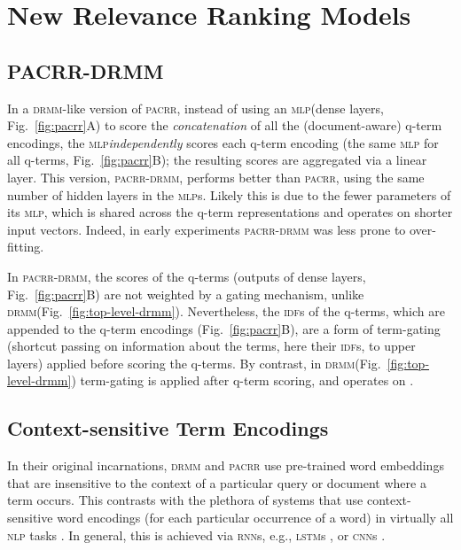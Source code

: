 \documentclass[11pt,a4paper]{article}
\newcommand{\mlp}{\textsc{mlp}\xspace}
\newcommand{\lstm}{\textsc{lstm}\xspace}
\newcommand{\rnn}{\textsc{rnn}\xspace}
\newcommand{\cnn}{\textsc{cnn}\xspace}
\newcommand{\nlp}{\textsc{nlp}\xspace}
\newcommand{\drmm}{\textsc{drmm}\xspace}
\newcommand{\pacrr}{\textsc{pacrr}\xspace}
\newcommand{\pacrrdrmm}{\textsc{pacrr-drmm}\xspace}
\newcommand{\idf}{\textsc{idf}\xspace}
\begin{document}
\section{New Relevance Ranking Models}



\subsection{PACRR-DRMM}
\label{sec:pacrr-drmm}

In a \drmm-like version of \pacrr, instead of 
using an \mlp (dense layers, Fig.~\ref{fig:pacrr}A) to score the 
\emph{concatenation} of all the (document-aware) q-term encodings, the \mlp \emph{independently} scores each q-term encoding
(the same \mlp for all q-terms, Fig.~\ref{fig:pacrr}B); the resulting scores are aggregated via a linear layer. This version, \pacrrdrmm, performs better than \pacrr, using the same number of hidden layers in the \mlp{s}. Likely this is due to the fewer parameters of its \mlp, which is shared across the q-term representations and operates on shorter input vectors. Indeed, in early experiments \pacrrdrmm was less prone to over-fitting. 

In \pacrrdrmm, the scores of the q-terms (outputs of dense layers, Fig.~\ref{fig:pacrr}B) are not weighted by a gating mechanism, unlike \drmm (Fig.~\ref{fig:top-level-drmm}). Nevertheless, the \idf{s} of the q-terms, which are appended to the q-term encodings (Fig.~\ref{fig:pacrr}B), are a form of term-gating (shortcut passing on information about the terms, here their \idf{s}, to upper layers) applied before scoring the q-terms. By contrast, in \drmm (Fig.~\ref{fig:top-level-drmm}) term-gating is applied after q-term scoring, and operates on .



\subsection{Context-sensitive Term Encodings}
\label{sec:input-encodings}

In their original incarnations, \drmm and \pacrr use pre-trained word embeddings that are insensitive to the context of a particular query or document where a term occurs. This contrasts with the plethora of systems that use context-sensitive word encodings (for each particular occurrence of a word) in virtually all \nlp tasks \cite{bahdanau2014neural,plank2016multilingual,lample2016neural}. In general, this is achieved via \rnn{s}, e.g., \lstm{s} \cite{gers1999learning}, or \cnn{s} \cite{bai2018empirical}.
\end{document}
